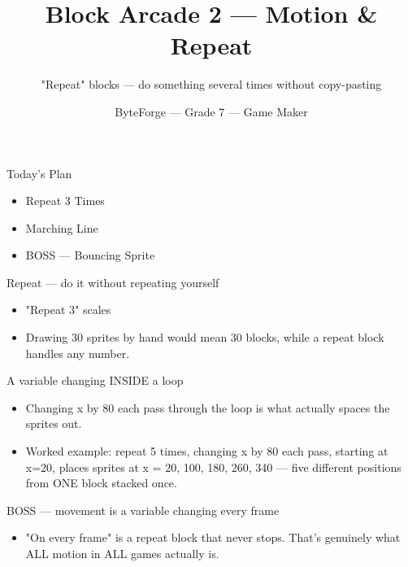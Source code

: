 \documentclass[aspectratio=169]{beamer}
\title{Block Arcade 2 — Motion \& Repeat}
\subtitle{"Repeat" blocks — do something several times without copy-pasting}
\author{ByteForge --- Grade 7 --- Game Maker}
\date{}
\begin{document}
\begin{frame}
    \titlepage
\end{frame}

\begin{frame}{Today's Plan}
    \begin{itemize}
        \item Repeat 3 Times
        \item Marching Line
        \item[$\bigstar$] BOSS --- Bouncing Sprite
    \end{itemize}
\end{frame}

\begin{frame}{Repeat — do it without repeating yourself}
    \large
    \begin{itemize}
        \item "Repeat 3" scales
        \item Drawing 30 sprites by hand would mean 30 blocks, while a repeat block handles any number.
    \end{itemize}

    \begin{center}
    \end{center}
\end{frame}


\begin{frame}{A variable changing INSIDE a loop}
    \large
    \begin{itemize}
        \item Changing x by 80 each pass through the loop is what actually spaces the sprites out.
        \item Worked example: repeat 5 times, changing x by 80 each pass, starting at x=20, places sprites at x = 20, 100, 180, 260, 340 — five different positions from ONE block stacked once.
    \end{itemize}
\end{frame}


\begin{frame}{BOSS — movement is a variable changing every frame}
    \large
    \begin{itemize}
        \item "On every frame" is a repeat block that never stops. That's genuinely what ALL motion in ALL games actually is.
    \end{itemize}
\end{frame}
\end{document}
